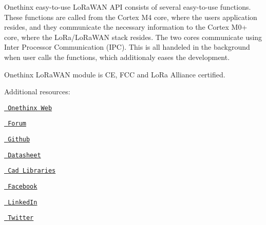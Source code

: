 Onethinx easy-\/to-\/use Lo\+Ra\+WAN API consists of several easy-\/to-\/use functions. These functions are called from the Cortex M4 core, where the users application resides, and they communicate the necessary information to the Cortex M0+ core, where the Lo\+Ra/\+Lo\+Ra\+WAN stack resides. The two cores communicate using Inter Processor Communication (IPC). This is all handeled in the background when user calls the functions, which additionaly eases the development.

Onethinx Lo\+Ra\+WAN module is CE, FCC and Lo\+Ra Alliance certified.



Additional resources\+:
\begin{DoxyItemize}
\item \href{https://www.onethinx.com/}{\texttt{ Onethinx Web}}
\item \href{https://forum.onethinx.com/}{\texttt{ Forum}}
\item \href{https://github.com/onethinx}{\texttt{ Github}}
\item \href{https://github.com/onethinx/Core_Datasheet}{\texttt{ Datasheet}}
\item \href{https://github.com/onethinx/CAD_libraries}{\texttt{ Cad Libraries}}
\item \href{https://www.facebook.com/Onethinx}{\texttt{ Facebook}}
\item \href{https://www.linkedin.com/company/onethinx}{\texttt{ Linked\+In}}
\item \href{https://twitter.com/onethinx}{\texttt{ Twitter}} 
\end{DoxyItemize}